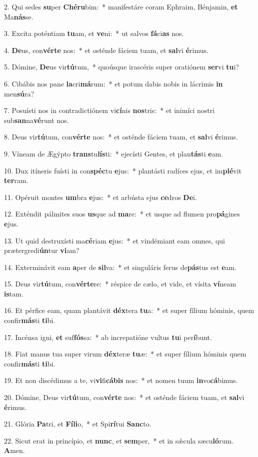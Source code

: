 2. Qui sedes \textbf{su}per \textbf{Ché}\textbf{ru}bim:~*  manifestáre coram Ephraim, Bénjamin, \textbf{et} Ma\textbf{nás}se.\

3. Excita poténtiam \textbf{tu}am, et \textbf{ve}ni:~*  ut salvos \textbf{fá}ci\textbf{as} nos.\

4. \textbf{De}us, con\textbf{vér}\textbf{te} nos:~*  et osténde fáciem tuam, et \textbf{sal}vi \textbf{é}rimus.\

5. Dómine, \textbf{De}us vir\textbf{tú}tum,~*  quoúsque irascéris super oratiónem \textbf{ser}vi \textbf{tu}i?\

6. Cibábis nos pane \textbf{la}cri\textbf{má}rum:~*  et potum dabis nobis in lácrimis \textbf{in} men\textbf{sú}ra?\

7. Posuísti nos in contradictiónem vi\textbf{cí}nis \textbf{nos}tris:~*  et inimíci nostri sub\textbf{san}na\textbf{vé}runt nos.\

8. Deus vir\textbf{tú}tum, con\textbf{vér}\textbf{te} nos:~*  et osténde fáciem tuam, et \textbf{sal}vi \textbf{é}rimus.\

9. Víneam de Ægýpto \textbf{trans}tu\textbf{lís}ti:~*  ejecísti Gentes, et plan\textbf{tás}ti \textbf{e}am.\

10. Dux itíneris fuísti in con\textbf{spéc}tu \textbf{e}jus:~*  plantásti radíces ejus, et im\textbf{plé}vit \textbf{ter}ram.\

11. Opéruit montes \textbf{um}bra \textbf{e}jus:~*  et arbústa ejus \textbf{ce}dros \textbf{De}i.\

12. Exténdit pálmites suos \textbf{us}que ad \textbf{ma}re:~*  et usque ad flumen pro\textbf{pá}gines \textbf{e}jus.\

13. Ut quid destruxísti ma\textbf{cé}riam \textbf{e}jus:~*  et vindémiant eam omnes, qui prætergredi\textbf{ún}tur \textbf{vi}am?\

14. Exterminávit eam \textbf{a}per de \textbf{sil}va:~*  et singuláris ferus de\textbf{pás}tus est \textbf{e}am.\

15. Deus vir\textbf{tú}tum, con\textbf{vér}\textbf{te}re:~*  réspice de cælo, et vide, et vísita \textbf{ví}neam \textbf{is}tam.\

16. Et pérfice eam, quam plantávit \textbf{déx}tera \textbf{tu}a:~*  et super fílium hóminis, quem confir\textbf{más}ti \textbf{ti}bi.\

17. Incénsa igni, \textbf{et} suf\textbf{fós}sa:~*  ab increpatióne vultus \textbf{tu}i per\textbf{í}bunt.\

18. Fiat manus tua super virum \textbf{déx}teræ \textbf{tu}æ:~*  et super fílium hóminis quem confir\textbf{más}ti \textbf{ti}bi.\

19. Et non discédimus a te, vi\textbf{vi}fi\textbf{cá}\textbf{bis} nos:~*  et nomen tuum \textbf{in}vo\textbf{cá}bimus.\

20. Dómine, Deus vir\textbf{tú}tum, con\textbf{vér}\textbf{te} nos:~*  et osténde fáciem tuam, et \textbf{sal}vi \textbf{é}rimus.\

21. Glória \textbf{Pa}tri, et \textbf{Fí}\textbf{li}o,~*  et Spi\textbf{rí}tui \textbf{Sanc}to.\

22. Sicut erat in princípio, et \textbf{nunc}, et \textbf{sem}per,~*  et in sǽcula sæcu\textbf{ló}rum. \textbf{A}men.\

